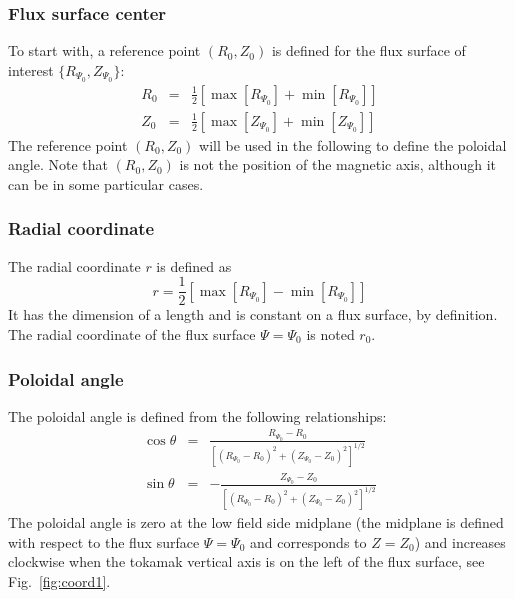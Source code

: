 \documentclass[a4paper]{report}
\begin{document}
\subsubsection{Flux surface center}
To start with, a reference point $(R_0,Z_0)$ is defined for the flux surface of interest $\{R_{\Psi_0},Z_{\Psi_0}\}$:
\begin{eqnarray}
 R_0 &=& \frac{1}{2}\left[\max[R_{\Psi_0}] + \min[R_{\Psi_0}]\right]\\
 Z_0 &=& \frac{1}{2}\left[\max[Z_{\Psi_0}] + \min[Z_{\Psi_0}]\right]
\end{eqnarray} 
The reference point  $(R_0,Z_0)$ will be used in the following to define the poloidal angle. Note that $(R_0,Z_0)$ is not the position of the magnetic axis, although it can be in some particular cases. 

\subsubsection{Radial coordinate}
The radial coordinate $r$ is defined as 
\begin{equation}
 r = \frac{1}{2}\left[\max[R_{\Psi_0}] - \min[R_{\Psi_0}]\right]
\end{equation}
It has the dimension of a length and is constant on a flux surface, by definition. The radial coordinate of the flux surface $\Psi=\Psi_0$ is noted $r_0$.

\subsubsection{Poloidal angle}
The poloidal angle is defined from the following relationships:
\begin{eqnarray}
 \cos \theta &=& \frac{R_{\Psi_0}-R_0}{\left[ (R_{\Psi_0}-R_0)^2 + (Z_{\Psi_0}-Z_0)^2 \right]^{1/2}}\\
 \sin \theta &=& -\frac{Z_{\Psi_0}-Z_0}{\left[ (R_{\Psi_0}-R_0)^2 + (Z_{\Psi_0}-Z_0)^2 \right]^{1/2}}
\end{eqnarray}
The poloidal angle is zero at the low field side midplane (the midplane is defined with respect to the flux surface $\Psi=\Psi_0$ and corresponds to $Z=Z_0$) and increases clockwise when the tokamak vertical axis is on the left of the flux surface, see Fig.~\ref{fig:coord1}.
\end{document}
